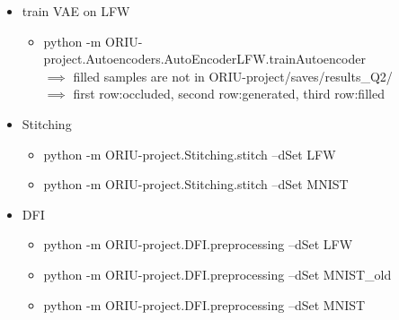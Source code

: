 \documentclass[
     11pt,         %
     a4paper,      %
     oneside,
     ]{article}
\begin{document}
\begin{itemize}
  \item train VAE on LFW
  \begin{itemize}
    \item python -m ORIU-project.Autoencoders.AutoEncoderLFW.trainAutoencoder \\
    $\implies$ filled samples are not in ORIU-project/saves/results\_Q2/ \\
    $\implies$ first row:occluded, second row:generated, third row:filled
  \end{itemize}
\end{itemize}


\begin{itemize}
  \item Stitching
  \begin{itemize}
    \item python -m ORIU-project.Stitching.stitch --dSet LFW
    \item python -m ORIU-project.Stitching.stitch --dSet MNIST
  \end{itemize}
\end{itemize}


\begin{itemize}
  \item DFI
  \begin{itemize}
      \item python -m ORIU-project.DFI.preprocessing --dSet LFW
      \item python -m ORIU-project.DFI.preprocessing --dSet MNIST\_old
      \item python -m ORIU-project.DFI.preprocessing --dSet MNIST
  \end{itemize}
\end{itemize}

\newpage
{}
%

\printbibheading
\printbibliography[keyword=image, title={Image Resources}]
\newpage
\printbibliography[keyword=text, title={Text Resources}]
\end{document}
